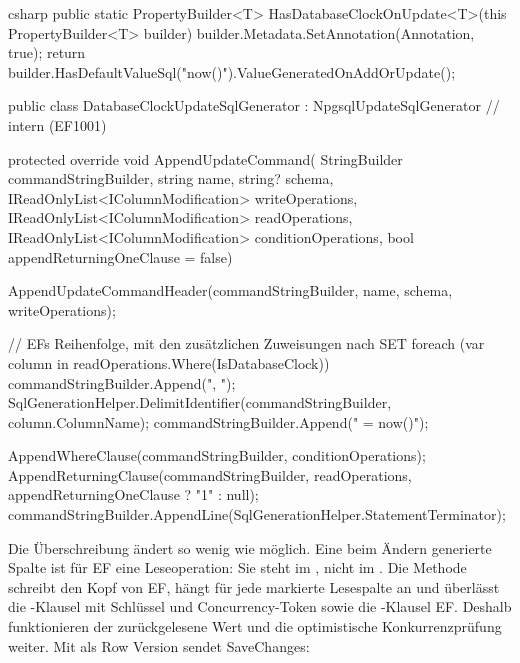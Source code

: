 \begin{sourcecode}{csharp}
public static PropertyBuilder<T> HasDatabaseClockOnUpdate<T>(this PropertyBuilder<T> builder)
{
    builder.Metadata.SetAnnotation(Annotation, true);
    return builder.HasDefaultValueSql("now()").ValueGeneratedOnAddOrUpdate();
}

public class DatabaseClockUpdateSqlGenerator : NpgsqlUpdateSqlGenerator   // intern (EF1001)
{
    protected override void AppendUpdateCommand(
        StringBuilder commandStringBuilder,
        string name,
        string? schema,
        IReadOnlyList<IColumnModification> writeOperations,
        IReadOnlyList<IColumnModification> readOperations,
        IReadOnlyList<IColumnModification> conditionOperations,
        bool appendReturningOneClause = false)
    {
        AppendUpdateCommandHeader(commandStringBuilder, name, schema, writeOperations);

        // EFs Reihenfolge, mit den zusätzlichen Zuweisungen nach SET
        foreach (var column in readOperations.Where(IsDatabaseClock))
        {
            commandStringBuilder.Append(", ");
            SqlGenerationHelper.DelimitIdentifier(commandStringBuilder, column.ColumnName);
            commandStringBuilder.Append(" = now()");
        }

        AppendWhereClause(commandStringBuilder, conditionOperations);
        AppendReturningClause(commandStringBuilder, readOperations,
            appendReturningOneClause ? "1" : null);
        commandStringBuilder.AppendLine(SqlGenerationHelper.StatementTerminator);
    }
}
\end{sourcecode}

Die Überschreibung ändert so wenig wie möglich. Eine beim Ändern generierte Spalte ist für EF
eine Leseoperation: Sie steht im , nicht im . Die Methode schreibt den
Kopf von EF, hängt für jede markierte Lesespalte  an und überlässt die
-Klausel mit Schlüssel und Concurrency-Token sowie die -Klausel EF.
Deshalb funktionieren der zurückgelesene Wert und die optimistische Konkurrenzprüfung weiter.
Mit  als Row Version sendet SaveChanges:

